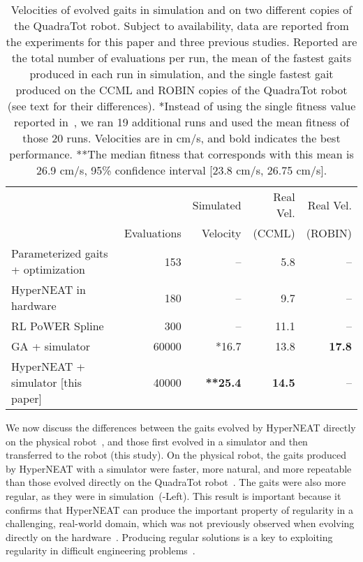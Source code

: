 \begin{table}
\begin{center}
\begin{tabular}{|l|r|r|r|r|}
\hline
                                         &              & Simulated  & Real Vel. & Real Vel.  \\
                                         & Evaluations  & Velocity &    (CCML)     & (ROBIN) \\
\hline
Parameterized gaits + optimization \cite{yos:clune}   &153    & --    & 5.8 & --\\
\hline
HyperNEAT in hardware \cite{yos:clune}                 & 180         & --         &   9.7  & --   \\
\hline
RL PoWER Spline \cite{haocheng}                         & 300         & --         &   11.1 & --\\
\hline
GA + simulator \cite{glette}             & 60000       & *16.7       &   13.8   & \textbf{17.8}  \\
\hline
HyperNEAT + simulator [this paper]                     & 40000       & \textbf{**25.4}       &   \textbf{14.5} & --\\
\hline
\end{tabular}
\vspace{.35cm}
\caption{Velocities of evolved gaits in simulation and on two different copies of the QuadraTot robot. Subject to availability, data are reported from the experiments for this paper and three previous studies. Reported are the total number of evaluations per run, the mean of the fastest gaits produced in each run in simulation, and the single fastest gait produced on the CCML and ROBIN copies of the QuadraTot robot (see text for their differences). *Instead of using the single fitness value reported in~\cite{glette}, we ran 19 additional runs and used the mean fitness of those 20 runs. Velocities are in cm/s, and bold indicates the best performance. **The median fitness that corresponds with this mean is 26.9 cm/s, 95\% confidence interval [23.8 cm/s, 26.75 cm/s].}  
\end{center}
\end{table}

We now discuss the differences between the gaits evolved by HyperNEAT directly on the physical robot~\cite{yos:clune}, and those first evolved in a simulator and then transferred to the robot (this study). 
On the physical robot, the gaits produced by HyperNEAT with a simulator were faster, more natural, and more repeatable than those evolved directly on the QuadraTot robot~\cite{yos:clune}. The gaits were also more regular, as they were in simulation~(-Left). This result is important because it confirms that HyperNEAT can produce the important property of
regularity in a challenging, real-world domain, which was not previously observed when
evolving directly on the hardware~\cite{yos:clune}. Producing regular solutions is a key to exploiting regularity in difficult engineering problems~\cite{clune2011performance}. 


